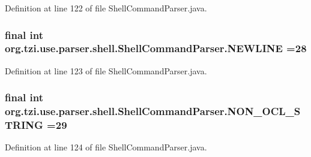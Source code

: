 Definition at line 122 of file Shell\-Command\-Parser.\-java.

\hypertarget{classorg_1_1tzi_1_1use_1_1parser_1_1shell_1_1_shell_command_parser_a28c520db9c13c98569da8afe6bfb0395}{
\subsubsection[{N\-E\-W\-L\-I\-N\-E}]{\setlength{\rightskip}{0pt plus 5cm}final int org.\-tzi.\-use.\-parser.\-shell.\-Shell\-Command\-Parser.\-N\-E\-W\-L\-I\-N\-E =28\hspace{0.3cm}{\ttfamily [static]}}}\label{classorg_1_1tzi_1_1use_1_1parser_1_1shell_1_1_shell_command_parser_a28c520db9c13c98569da8afe6bfb0395}


Definition at line 123 of file Shell\-Command\-Parser.\-java.

\hypertarget{classorg_1_1tzi_1_1use_1_1parser_1_1shell_1_1_shell_command_parser_a0070a9bd329bf4555bb81125263a5196}{
\subsubsection[{N\-O\-N\-\_\-\-O\-C\-L\-\_\-\-S\-T\-R\-I\-N\-G}]{\setlength{\rightskip}{0pt plus 5cm}final int org.\-tzi.\-use.\-parser.\-shell.\-Shell\-Command\-Parser.\-N\-O\-N\-\_\-\-O\-C\-L\-\_\-\-S\-T\-R\-I\-N\-G =29\hspace{0.3cm}{\ttfamily [static]}}}\label{classorg_1_1tzi_1_1use_1_1parser_1_1shell_1_1_shell_command_parser_a0070a9bd329bf4555bb81125263a5196}


Definition at line 124 of file Shell\-Command\-Parser.\-java.

